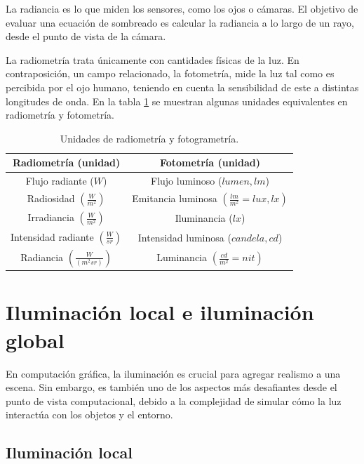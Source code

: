 La radiancia es lo que miden los sensores, como los ojos o cámaras.
El objetivo de evaluar una ecuación de sombreado es calcular la radiancia a lo largo de un rayo, desde el punto de vista de la cámara.

La radiometría trata únicamente con cantidades físicas de la luz.
En contraposición, un campo relacionado, la fotometría, mide la luz tal como es percibida por el ojo humano, teniendo en cuenta la sensibilidad de este a distintas longitudes de onda.
En la tabla \ref{table:light_units} se muestran algunas unidades equivalentes en radiometría y fotometría.

\begin{table}
\centering
\begin{tabular}{|c|c|}
    \hline
    \textbf{Radiometría (unidad)} & \textbf{Fotometría (unidad)} \\
    \hline
    Flujo radiante ($W$) & Flujo luminoso ($lumen, lm$) \\
    \hline
    Radiosidad $\left(\frac{W}{m^2}\right)$ & Emitancia luminosa $\left(\frac{lm}{m^2} = lux, lx\right)$ \\
    \hline
    Irradiancia $\left(\frac{W}{m^2}\right)$ & Iluminancia ($lx$) \\
    \hline
    Intensidad radiante $\left(\frac{W}{sr}\right)$ & Intensidad luminosa ($candela, cd$) \\
    \hline
    Radiancia $\left(\frac{W}{(m^2sr)}\right)$ & Luminancia $\left(\frac{cd}{m^2} = nit\right)$ \\
    \hline
\end{tabular}
\caption{Unidades de radiometría y fotogrametría.}
\label{table:light_units}
\end{table}

\section{Iluminación local e iluminación global}\label{sec:local_vs_global}

En computación gráfica, la iluminación es crucial para agregar realismo a una escena.
Sin embargo, es también uno de los aspectos más desafiantes desde el punto de vista computacional, debido a la complejidad de simular cómo la luz interactúa con los objetos y el entorno.

\subsection{Iluminación local}

